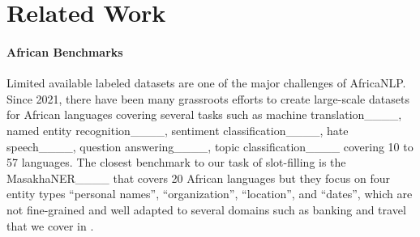 \section{Related Work}

\paragraph{African Benchmarks}
Limited available labeled datasets are one of the major challenges of AfricaNLP. Since 2021, there have been many grassroots efforts to create large-scale datasets for African languages covering several tasks such as machine translation____, named entity recognition____, sentiment classification____, hate speech____, question answering____, topic classification____ covering 10 to 57 languages. %
The closest benchmark to our task of slot-filling is the MasakhaNER____ that covers 20 African languages but they focus on four entity types  ``personal names'', ``organization'', ``location'', and ``dates'', which are not fine-grained and well adapted to several domains such as banking and travel %
that we cover in \dataset{}. 




